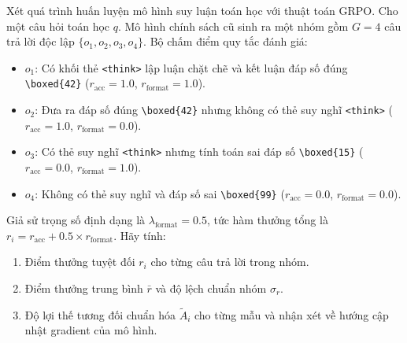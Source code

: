 \begin{example}
Xét quá trình huấn luyện mô hình suy luận toán học với thuật toán GRPO. Cho một câu hỏi toán học $q$. Mô hình chính sách cũ sinh ra một nhóm gồm $G = 4$ câu trả lời độc lập $\{o_1, o_2, o_3, o_4\}$.
Bộ chấm điểm quy tắc đánh giá:
\begin{itemize}
  \item $o_1$: Có khối thẻ \verb|<think>| lập luận chặt chẽ và kết luận đáp số đúng \verb|\boxed{42}| ($r_{\text{acc}} = 1.0$, $r_{\text{format}} = 1.0$).
  \item $o_2$: Đưa ra đáp số đúng \verb|\boxed{42}| nhưng không có thẻ suy nghĩ \verb|<think>| ($r_{\text{acc}} = 1.0$, $r_{\text{format}} = 0.0$).
  \item $o_3$: Có thẻ suy nghĩ \verb|<think>| nhưng tính toán sai đáp số \verb|\boxed{15}| ($r_{\text{acc}} = 0.0$, $r_{\text{format}} = 1.0$).
  \item $o_4$: Không có thẻ suy nghĩ và đáp số sai \verb|\boxed{99}| ($r_{\text{acc}} = 0.0$, $r_{\text{format}} = 0.0$).
\end{itemize}
Giả sử trọng số định dạng là $\lambda_{\text{format}} = 0.5$, tức hàm thưởng tổng là $r_i = r_{\text{acc}} + 0.5 \times r_{\text{format}}$.
Hãy tính:
\begin{enumerate}
  \item Điểm thưởng tuyệt đối $r_i$ cho từng câu trả lời trong nhóm.
  \item Điểm thưởng trung bình $\bar{r}$ và độ lệch chuẩn nhóm $\sigma_r$.
  \item Độ lợi thế tương đối chuẩn hóa $\widetilde{A}_i$ cho từng mẫu và nhận xét về hướng cập nhật gradient của mô hình.
\end{enumerate}
\end{example}

